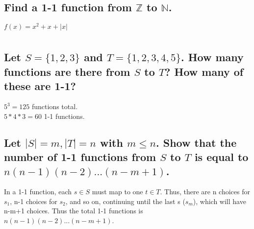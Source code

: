 \documentclass[12pt]{article}
\begin{document}
\subsection{Find a 1-1 function from $\mathds{Z}$ to $\mathds{N}$.}
$f(x) = x^2 + x + |x|$

\section{}
\subsection{
    Let $S = \{1,2,3\}$ and $T = \{1,2,3,4,5\}$. How many functions are there from $S$ to $T$? How many of these are 1-1?
}
$5^3 = 125$ functions total.\\
$5*4*3 = 60$ 1-1 functions.

\subsection{
    Let $|S| = m, |T| = n$ with $m \leq n$. Show that the number of 1-1 functions from $S$ to $T$ is equal to $n(n-1)(n-2)...(n-m+1)$.
}
In a 1-1 function, each $s \in S$ must map to one $t \in T$. Thus, there are n choices for $s_1$, n-1 choices for $s_2$,
and so on, continuing until the last s ($s_m$), which will have n-m+1 choices. Thus the total 1-1 functions is $n(n-1)(n-2)...(n-m+1)$.
\end{document}
